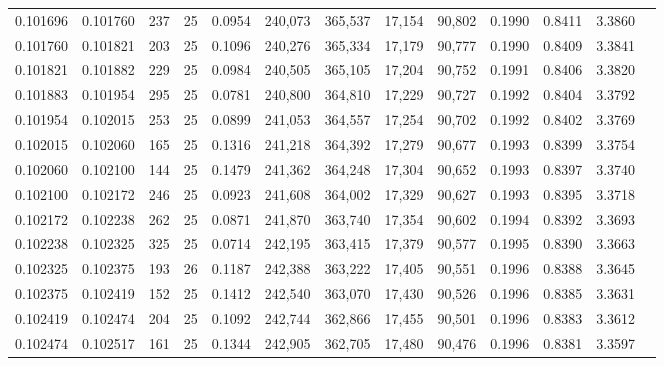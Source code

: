 \begin{tabular}{rrrrrrrrrrrrr}
0.101696 & 0.101760 &   237 &  25 &                                     0.0954 & 240,073 & 365,537 &  17,154 &  90,802 & 0.1990 & 0.8411 & 3.3860 \\
0.101760 & 0.101821 &   203 &  25 &                                     0.1096 & 240,276 & 365,334 &  17,179 &  90,777 & 0.1990 & 0.8409 & 3.3841 \\
0.101821 & 0.101882 &   229 &  25 &                                     0.0984 & 240,505 & 365,105 &  17,204 &  90,752 & 0.1991 & 0.8406 & 3.3820 \\
0.101883 & 0.101954 &   295 &  25 &                                     0.0781 & 240,800 & 364,810 &  17,229 &  90,727 & 0.1992 & 0.8404 & 3.3792 \\
0.101954 & 0.102015 &   253 &  25 &                                     0.0899 & 241,053 & 364,557 &  17,254 &  90,702 & 0.1992 & 0.8402 & 3.3769 \\
0.102015 & 0.102060 &   165 &  25 &                                     0.1316 & 241,218 & 364,392 &  17,279 &  90,677 & 0.1993 & 0.8399 & 3.3754 \\
0.102060 & 0.102100 &   144 &  25 &                                     0.1479 & 241,362 & 364,248 &  17,304 &  90,652 & 0.1993 & 0.8397 & 3.3740 \\
0.102100 & 0.102172 &   246 &  25 &                                     0.0923 & 241,608 & 364,002 &  17,329 &  90,627 & 0.1993 & 0.8395 & 3.3718 \\
0.102172 & 0.102238 &   262 &  25 &                                     0.0871 & 241,870 & 363,740 &  17,354 &  90,602 & 0.1994 & 0.8392 & 3.3693 \\
0.102238 & 0.102325 &   325 &  25 &                                     0.0714 & 242,195 & 363,415 &  17,379 &  90,577 & 0.1995 & 0.8390 & 3.3663 \\
0.102325 & 0.102375 &   193 &  26 &                                     0.1187 & 242,388 & 363,222 &  17,405 &  90,551 & 0.1996 & 0.8388 & 3.3645 \\
0.102375 & 0.102419 &   152 &  25 &                                     0.1412 & 242,540 & 363,070 &  17,430 &  90,526 & 0.1996 & 0.8385 & 3.3631 \\
0.102419 & 0.102474 &   204 &  25 &                                     0.1092 & 242,744 & 362,866 &  17,455 &  90,501 & 0.1996 & 0.8383 & 3.3612 \\
0.102474 & 0.102517 &   161 &  25 &                                     0.1344 & 242,905 & 362,705 &  17,480 &  90,476 & 0.1996 & 0.8381 & 3.3597 \\

\end{tabular}
